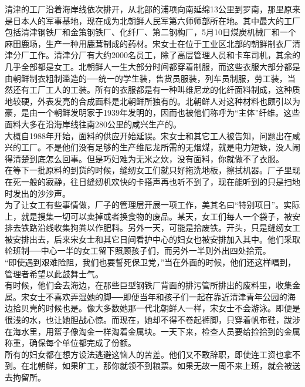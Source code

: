 清津的工厂沿着海岸线依次排开，从北部的浦项向南延绵13公里到罗南，那里原来是日本人的军事基地，现在成为北朝鲜人民军第六师师部所在地。其中最大的工厂包括清津钢铁厂和金策钢铁厂、化纤厂、第二钢构厂，5月10日煤炭机械厂和一个麻田鹿场，生产一种用鹿茸制成的药材。宋女士在位于工业区北部的朝鲜制衣厂清津分厂工作。清津分厂有大约2000名员工，除了高层管理人员和卡车司机，其余的几乎全部都是女工。北朝鲜人一生大部分时间都穿着制服，而这些衣服大部分都是由朝鲜制衣粗制滥造的──统一的学生装，售货员服装，列车员制服，劳工装，当然还有工厂工人的工装。所有的衣服都是有一种叫维尼龙的化纤面料制成，这种质地较硬，外表发亮的合成面料是北朝鲜所独有的。北朝鲜人对这种材料也颇引以为豪，是由一个朝鲜发明家于1939年发明的，因而也被他们称呼为“主体”纤维。这些面料大多在沿海岸线往南280公里的咸兴生产的。\\

大概自1988年开始，面料的供应开始延误。宋女士和其它工人被告知，问题出在咸兴的工厂。不是他们没有足够的生产维尼龙所需的无烟煤，就是电力短缺，没人闹得清楚到底怎么回事。但是巧妇难为无米之炊，没有面料，你就做不了衣服。\\

在等下一批原料的到货的时候，缝纫女工们就只好拖洗地板，擦拭机器。厂子里现在死一般的寂静，往日缝纫机欢快的卡搭声再也听不到了，现在能听到的只是扫地时发出的沙沙声。\\

为了让女工有些事情做，厂子的管理层开展一项工作，美其名曰“特别项目”。实际上，就是搜集一切可以卖掉或者换食物的废品。某天，女工们每人一个袋子，被安排去铁路沿线收集狗粪以作肥料。另外一天，可能是拾废铁。开头，只是缝纫女工被安排出去，后来宋女士和其它日间看护中心的妇女也被安排加入其中。他们采取轮班制──中心一半的女工留下照顾孩子们，而另外一半则外出四处拾荒。\\

“即使遇到艰难险阻，我们也要誓死保卫党，”当在外面的时候，他们还这样唱到，管理者希望以此鼓舞士气。\\

有时候，他们会去海边，在那些巨型钢铁厂背面的排污管所排出的废料里，收集金属。宋女士不喜欢弄湿她的脚──即便当年和孩子们一起在靠近清津青年公园的海边拾贝壳的时候也是。像大多数她那一代北朝鲜人一样，宋女士不会游泳。即便是很浅的水，也让她胆战心惊。而现在，她却不得不卷起裤脚，只穿着帆布鞋，跋涉在海水里，用篮子像淘金一样淘着金属块。一天下来，检查人员要给捡拾到的金属称重，确保每个单位都完成了份额。\\

所有的妇女都在想方设法逃避这恼人的苦差。他们又不敢辞职，即使连工资也拿不到。在北朝鲜，如果旷工，那你就领不到粮票。如果无故一周不来上班，就会被送去拘留所。\\

